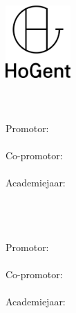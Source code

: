 
\begin{titlepage}
  \begin{center}

    \begingroup
    \rmfamily
    \includegraphics[width=2.5cm]{img/HG-beeldmerk-woordmerk}\\[.5cm]
    \faculteit\\[3cm]
    \titel
    \vfill
    \student\\[3.5cm]
    \rapporttype\\[2cm]
    Promotor:\\
    \promotor\\
    Co-promotor:\\
    \copromotor\\[2.5cm]
    Academiejaar: \academiejaar\\[.5cm]
    \examenperiode
    \endgroup

  \end{center}
  \restoregeometry
\end{titlepage}


\emptypage


\begin{titlepage}
  \begin{center}

    \begingroup
    \rmfamily
    \faculteit\\[3cm]
    \titel
    \vfill
    \student\\[3.5cm]
    \rapporttype\\[2cm]
    Promotor:\\
    \promotor\\
    Co-promotor:\\
    \copromotor\\[2.5cm]
    Academiejaar: \academiejaar\\[.5cm]
    \examenperiode
    \endgroup

  \end{center}
  \restoregeometry
\end{titlepage}


